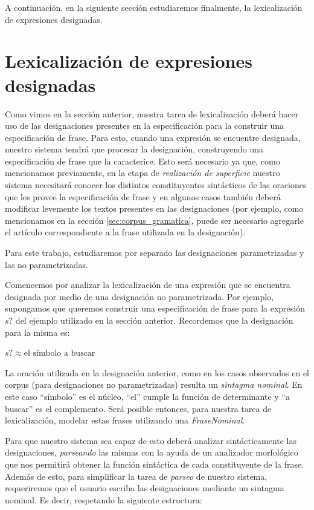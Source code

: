 A continuación, en la siguiente sección estudiaremos finalmente, la lexicalización de expresiones designadas.

\section{Lexicalización de expresiones designadas}
\label{sec:verbalizacion_designaciones}
Como vimos en la sección anterior, nuestra tarea de lexicalización deberá hacer uso de las designaciones presentes en la especificación para la construir una especificación de frase. Para esto, cuando una expresión se encuentre designada, nuestro sistema tendrá que procesar la designación, construyendo una especificación de frase que la caracterice. Esto será necesario ya que, como mencionamos previamente, en la etapa de \emph{realización de superficie} nuestro sistema necesitará conocer los distintos constituyentes sintácticos de las oraciones que les provee la especificación de frase y en algunos casos también deberá modificar levemente los textos presentes en las designaciones (por ejemplo, como mencionamos en la sección \ref{sec:corpus_gramatica}, puede ser necesario agregarle el artículo correspondiente a la frase utilizada en la designación).

Para este trabajo, estudiaremos por separado las designaciones parametrizadas y las no parametrizadas.

Comencemos por analizar la lexicalización de una expresión que se encuentra designada por medio de una designación no parametrizada. Por ejemplo, supongamos que queremos construir una especificación de frase para la expresión $s?$ del ejemplo utilizado en la sección anterior. Recordemos que la designación para la misma es:

\begin{center} 
  $s? \approx \text{el símbolo a buscar}$ 
\end{center}

La oración utilizada en la designación anterior, como en los casos observados en el corpus (para designaciones no parametrizadas) resulta un \emph{sintagma nominal}. En este caso ``símbolo'' es el núcleo, ``el'' cumple la función de determinante y ``a buscar'' es el complemento. Será posible entonces, para nuestra tarea de lexicalización, modelar estas frases utilizando una \emph{FraseNominal}. 

Para que nuestro sistema sea capaz de esto deberá analizar sintácticamente las designaciones, \textit{parseando} las mismas con la ayuda de un analizador morfológico que nos permitirá obtener la función sintáctica de cada constituyente de la frase. Además de esto, para simplificar la tarea de \emph{parseo} de nuestro sistema, requeriremos que el usuario escriba las designaciones mediante un sintagma nominal. Es decir, respetando la siguiente estructura:

